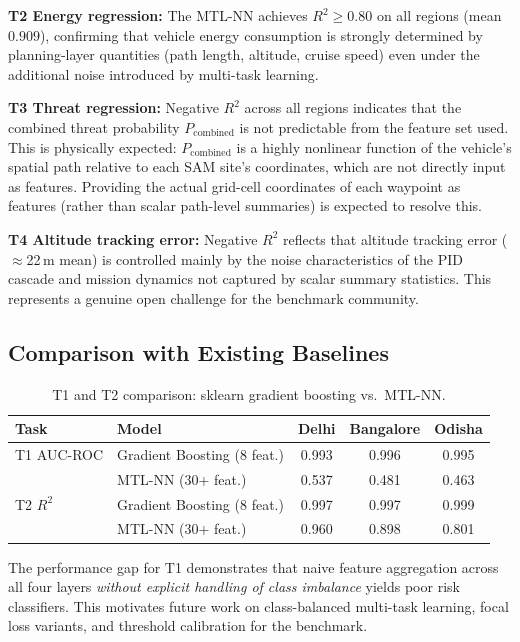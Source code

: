 \documentclass{article}
\begin{document}
\textbf{T2 Energy regression:} The MTL-NN achieves $R^2 \geq 0.80$ on all
regions (mean $0.909$), confirming that vehicle energy consumption is strongly
determined by planning-layer quantities (path length, altitude, cruise speed)
even under the additional noise introduced by multi-task learning.

\textbf{T3 Threat regression:} Negative $R^2$ across all regions indicates
that the combined threat probability $P_\text{combined}$ is not predictable
from the feature set used. This is physically expected: $P_\text{combined}$
is a highly nonlinear function of the vehicle's spatial path relative to
each SAM site's coordinates, which are not directly input as features.
Providing the actual grid-cell coordinates of each waypoint as features
(rather than scalar path-level summaries) is expected to resolve this.

\textbf{T4 Altitude tracking error:} Negative $R^2$ reflects that altitude
tracking error ($\approx$22\,m mean) is controlled mainly by the noise
characteristics of the PID cascade and mission dynamics not captured by
scalar summary statistics. This represents a genuine open challenge for
the benchmark community.

\subsection{Comparison with Existing Baselines}
\label{sec:comparison}

\begin{table}[h]
\centering
\caption{T1 and T2 comparison: sklearn gradient boosting vs.\ MTL-NN.}
\label{tab:comparison}
\begin{tabular}{llccc}
\toprule
Task & Model & Delhi & Bangalore & Odisha \\
\midrule
T1 AUC-ROC & Gradient Boosting (8 feat.) & 0.993 & 0.996 & 0.995 \\
           & MTL-NN (30+ feat.) & 0.537 & 0.481 & 0.463 \\
\midrule
T2 $R^2$   & Gradient Boosting (8 feat.) & 0.997 & 0.997 & 0.999 \\
           & MTL-NN (30+ feat.)          & 0.960 & 0.898 & 0.801 \\
\bottomrule
\end{tabular}
\end{table}

The performance gap for T1 demonstrates that naive feature aggregation
across all four layers \emph{without explicit handling of class imbalance}
yields poor risk classifiers. This motivates future work on class-balanced
multi-task learning, focal loss variants, and threshold calibration for
the benchmark.
\end{document}
